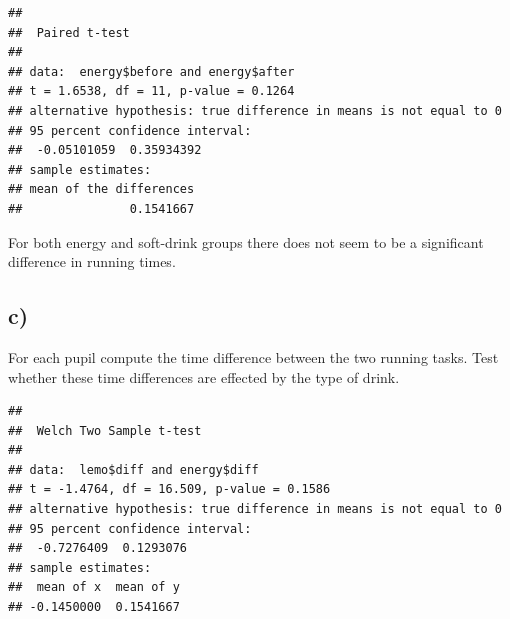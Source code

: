 \documentclass[
]{article}
\newenvironment{Shaded}{\begin{snugshade}}{\end{snugshade}}
\newcommand{\AttributeTok}[1]{\textcolor[rgb]{0.77,0.63,0.00}{#1}}
\newcommand{\CommentTok}[1]{\textcolor[rgb]{0.56,0.35,0.01}{\textit{#1}}}
\newcommand{\ConstantTok}[1]{\textcolor[rgb]{0.00,0.00,0.00}{#1}}
\newcommand{\FunctionTok}[1]{\textcolor[rgb]{0.00,0.00,0.00}{#1}}
\newcommand{\NormalTok}[1]{#1}
\newcommand{\OtherTok}[1]{\textcolor[rgb]{0.56,0.35,0.01}{#1}}
\newcommand{\SpecialCharTok}[1]{\textcolor[rgb]{0.00,0.00,0.00}{#1}}
\newcommand{\StringTok}[1]{\textcolor[rgb]{0.31,0.60,0.02}{#1}}
\begin{document}
\begin{Shaded}
\end{Shaded}

\begin{verbatim}
## 
##  Paired t-test
## 
## data:  energy$before and energy$after
## t = 1.6538, df = 11, p-value = 0.1264
## alternative hypothesis: true difference in means is not equal to 0
## 95 percent confidence interval:
##  -0.05101059  0.35934392
## sample estimates:
## mean of the differences 
##               0.1541667
\end{verbatim}

For both energy and soft-drink groups there does not seem to be a
significant difference in running times.

\hypertarget{c-2}{%
\subsection{c)}\label{c-2}}

For each pupil compute the time difference between the two running
tasks. Test whether these time differences are effected by the type of
drink.

\begin{Shaded}
\end{Shaded}

\begin{verbatim}
## 
##  Welch Two Sample t-test
## 
## data:  lemo$diff and energy$diff
## t = -1.4764, df = 16.509, p-value = 0.1586
## alternative hypothesis: true difference in means is not equal to 0
## 95 percent confidence interval:
##  -0.7276409  0.1293076
## sample estimates:
##  mean of x  mean of y 
## -0.1450000  0.1541667
\end{verbatim}
\end{document}
